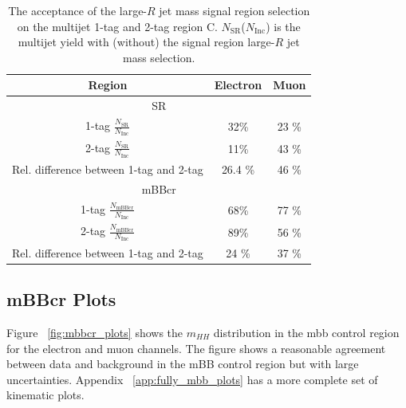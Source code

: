 \begin{table}[!htbp]
\begin{center}
\begin{tabular}{c|c|c}
\hline
Region    & Electron          & Muon      \\
\hline
\multicolumn{3}{c}{SR} \\
\hline
1-tag $\frac{N_\text{SR}}{N_\text{Inc}}$ &  32\% & 23 \% \\
2-tag $\frac{N_\text{SR}}{N_\text{Inc}}$ &  11\% & 43 \% \\
\hline \hline
Rel. difference between 1-tag and 2-tag & 26.4 \% & 46 \% \\
\hline
\multicolumn{3}{c}{mBBcr} \\
\hline
1-tag $\frac{N_\text{mBBcr}}{N_\text{Inc}}$ &  68\% & 77 \% \\
2-tag $\frac{N_\text{mBBcr}}{N_\text{Inc}}$ &  89\% & 56 \% \\
\hline \hline
Rel. difference between 1-tag and 2-tag &  24 \% &   37 \% \\
\end{tabular}
\end{center}
\caption[The acceptance of the large-$R$ jet mass signal region selection on the multijet
1-tag and 2-tag region C]{The acceptance of the large-$R$ jet mass signal region selection on the multijet
1-tag and 2-tag region C. $N_\text{SR}$($N_\text{Inc}$) is the multijet yield
with (without) the signal region large-$R$ jet mass selection.}
\label{tab:boosted_syst_qcd_norm_mBBAcc}
\end{table}
 
\subsection{mBBcr Plots}
\label{ssec:mbbcr_plots_whad}
Figure ~\ref{fig:mbbcr_plots} shows the $m_{HH}$ distribution in the mbb control region for the electron and muon channels. The figure shows a reasonable agreement between data and background in the mBB control region but with large uncertainties. Appendix ~\ref{app:fully_mbb_plots} has a more complete set of kinematic plots. 

